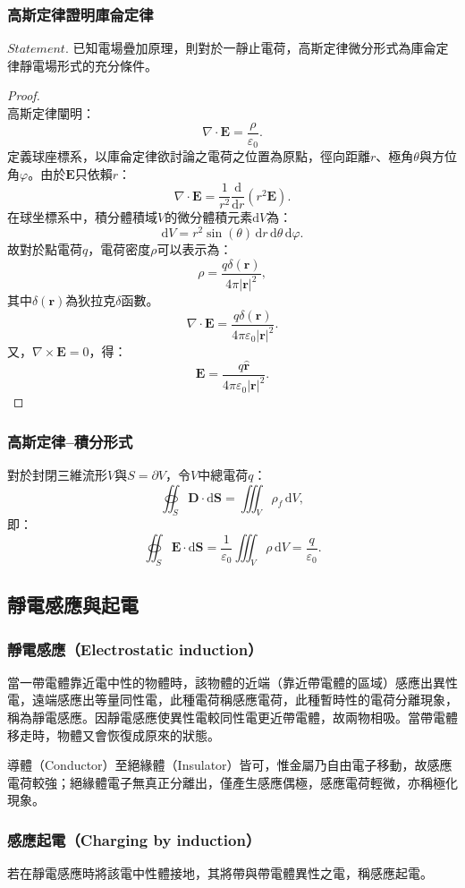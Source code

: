 \documentclass[a4paper,12pt]{report}
\begin{document}
\begin{itemize}
\subsubsection{高斯定律證明庫侖定律}
\(\textit{Statement.}\) 已知電場疊加原理，則對於一靜止電荷，高斯定律微分形式為庫侖定律靜電場形式的充分條件。
\begin{proof}\mbox{}\\
高斯定律闡明：
\[\nabla\cdot\mathbf{E}=\frac{\rho}{\varepsilon_0}.\]
定義球座標系，以庫侖定律欲討論之電荷之位置為原點，徑向距離$r$、極角$\theta$與方位角$\varphi$。由於$\mathbf{E}$只依賴$r$：
\[\nabla\cdot\mathbf{E}=\frac{1}{r^2}\frac{\mathrm{d}}{\mathrm{d} r}\left(r^2\mathbf{E}\right).\]
在球坐標系中，積分體積域$V$的微分體積元素$\mathrm{d}V$為：
\[\mathrm{d}V=r^2\sin(\theta)\,\mathrm{d}r\,\mathrm{d}\theta\,\mathrm{d}\varphi.\]
故對於點電荷$q$，電荷密度$\rho$可以表示為：
\[\rho=\frac{q\delta(\mathbf{r})}{4\pi|\mathbf{r}|^2},\]
其中$\delta(\mathbf{r})$為狄拉克$\delta$函數。
\[\nabla\cdot\mathbf{E}=\frac{q\delta(\mathbf{r})}{4\pi\varepsilon_0|\mathbf{r}|^2}.\]
又，$\nabla\times\mathbf{E}=0$，得：
\[\mathbf{E}=\frac{q\hat{\mathbf{r}}}{4\pi\varepsilon_0|\mathbf{r}|^2}.\]
\end{proof}
\subsubsection{高斯定律–積分形式}
對於封閉三維流形$V$與$S=\partial V$，令$V$中總電荷$q$：
\[\oiint_S\mathbf{D}\cdot\mathrm{d}\mathbf{S}=\iiint_V\rho_f\,\mathrm{d}V,\]
即：
\[\oiint_{S}\mathbf {E} \cdot \mathrm{d}\mathbf{S}=\frac{1}{\varepsilon_0}\iiint_V\rho\,\mathrm{d}V=\frac{q}{\varepsilon_0}.\]
\subsection{靜電感應與起電}
\subsubsection{靜電感應（Electrostatic induction）}
當一帶電體靠近電中性的物體時，該物體的近端（靠近帶電體的區域）感應出異性電，遠端感應出等量同性電，此種電荷稱感應電荷，此種暫時性的電荷分離現象，稱為靜電感應。因靜電感應使異性電較同性電更近帶電體，故兩物相吸。當帶電體移走時，物體又會恢復成原來的狀態。

導體（Conductor）至絕緣體（Insulator）皆可，惟金屬乃自由電子移動，故感應電荷較強；絕緣體電子無真正分離出，僅產生感應偶極，感應電荷輕微，亦稱極化現象。
\subsubsection{感應起電（Charging by induction）}
若在靜電感應時將該電中性體接地，其將帶與帶電體異性之電，稱感應起電。

\end{itemize}
\end{document}
